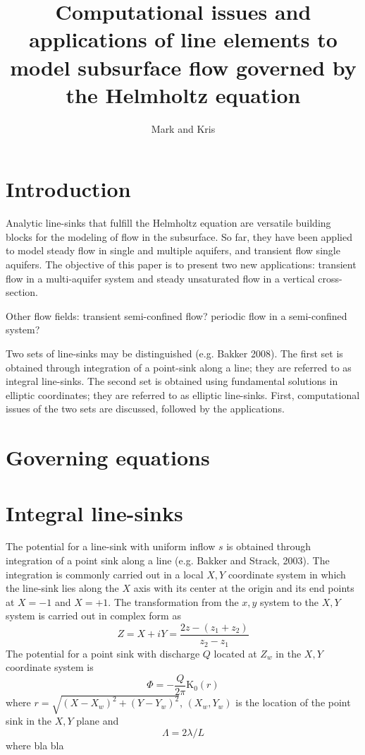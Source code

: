 \documentclass{elsart}
\begin{document}
\title{Computational issues and applications of line elements to model subsurface flow governed by the Helmholtz equation}
\author{Mark and Kris}

\maketitle

\linenumbers

\section{Introduction}

Analytic line-sinks that fulfill the Helmholtz equation are versatile building blocks for the modeling of flow in the subsurface. So far, they have been applied to model steady flow in single and multiple aquifers, and transient flow single aquifers.
The objective of this paper is to present two new applications: transient flow in a multi-aquifer system and steady unsaturated flow in a vertical cross-section. 

Other flow fields: transient semi-confined flow? periodic flow in a semi-confined system?

Two sets of line-sinks may be distinguished (e.g. Bakker 2008). The first set is obtained through integration of a point-sink along a line; they are referred to as integral line-sinks. The second set is obtained using fundamental solutions in elliptic coordinates; they are referred to as elliptic line-sinks. First, computational issues of the two sets are discussed, followed by the applications.

\section{Governing equations}


\section{Integral line-sinks}
The potential for a line-sink with uniform inflow $s$ is obtained through integration of a point sink along a line (e.g. Bakker and Strack, 2003). The integration is commonly carried out in a local $X,Y$ coordinate system in which the line-sink lies along the $X$ axis with its center at the origin and its end points at $X=-1$ and $X=+1$. The transformation from the $x,y$ system to the $X,Y$ system is carried out in complex form as
\begin{equation}
Z = X+iY = \frac{2z-(z_1+z_2)}{z_2-z_1}
\end{equation}
The potential for a point sink with discharge $Q$ located at $Z_w$ in the $X,Y$ coordinate system is
\begin{equation}
\Phi = -\frac{Q}{2\pi}\text{K}_0(r)
\end{equation}
where $r=\sqrt{(X-X_w)^2+(Y-Y_w)^2}$, $(X_w,Y_w)$ is the location of the point sink in the $X,Y$ plane and 
\begin{equation}
\Lambda = 2\lambda/L
\end{equation}
where  bla bla
\end{document}
